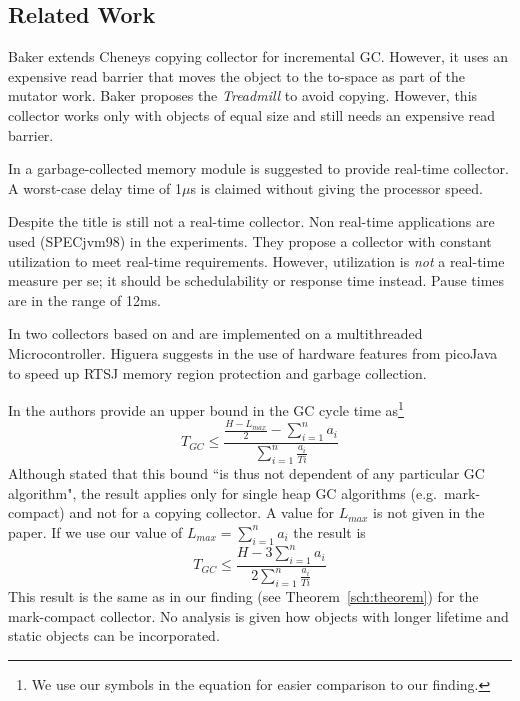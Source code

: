 \subsection{Related Work}

Baker \cite{gc:baker78} extends Cheneys \cite{gc:cheney70} copying
collector for incremental GC. However, it uses an expensive read
barrier that moves the object to the to-space as part of the mutator
work. Baker proposes the \emph{Treadmill} \cite{gc:baker92} to avoid
copying. However, this collector works only with objects of equal
size and still needs an expensive read barrier.

In \cite{gc:hwgc94} a garbage-collected memory module is suggested
to provide real-time collector. A worst-case delay time of 1$\mu$s
is claimed without giving the processor speed.

Despite the title \cite{gc:bacon03} is still not a real-time
collector. Non real-time applications are used (SPECjvm98) in the
experiments. They propose a collector with constant utilization to
meet real-time requirements. However, utilization is \emph{not} a
real-time measure per se; it should be schedulability or response
time instead. Pause times are in the range of 12ms.

In \cite{gc:pfeffer04} two collectors based on \cite{gc:dijkstra78}
and \cite{gc:baker92} are implemented on a multithreaded
Microcontroller.  Higuera suggests in \cite{gc:higu02} the use of
hardware features from picoJava to speed up RTSJ memory region
protection and garbage collection.

In \cite{780745} the authors provide an upper bound in the GC cycle
time as\footnote{We use our symbols in the equation for easier
comparison to our finding.}
%
\begin{equation}
\nonumber
    T_{GC} \le \frac{\frac{H-L_{max}}{2}-\sum_{i=1}^{n} a_i}{\sum_{i=1}^{n} \frac{a_i}{Ti}}
\end{equation}
%
Although stated that this bound ``is thus not dependent of any
particular GC algorithm", the result applies only for single heap GC
algorithms (e.g.\ mark-compact) and not for a copying collector. A
value for $L_{max}$ is not given in the paper. If we use our value
of $L_{max} =\sum_{i=1}^{n} a_i$ the result is
%
\begin{equation}
\nonumber
    T_{GC} \le \frac{H-3\sum_{i=1}^{n} a_i}{2\sum_{i=1}^{n} \frac{a_i}{Ti}}
\end{equation}
%
This result is the same as in our finding (see
Theorem~\ref{sch:theorem}) for the mark-compact collector. No
analysis is given how objects with longer lifetime and static
objects can be incorporated.
